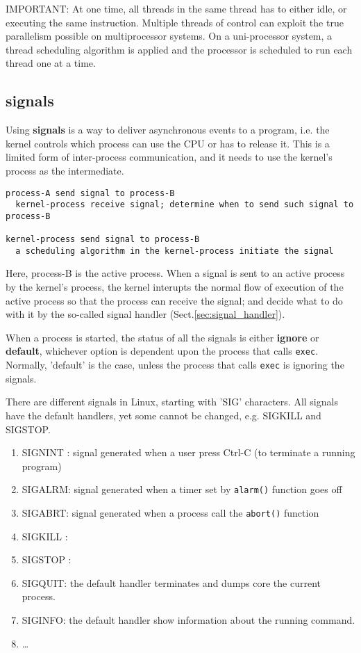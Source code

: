 IMPORTANT: At one time, all threads in the same thread has to either idle, or
executing the same instruction.
Multiple threads of control can exploit the true parallelism possible on
multiprocessor systems. On a uni-processor system, a thread scheduling algorithm
is applied and the processor is scheduled to run each thread one at a time.




\subsection{signals}
\label{sec:signals}

Using {\bf signals} is a way to deliver asynchronous events to a program, i.e.
the kernel controls which process can use the CPU or has to release it.
This is a limited form of inter-process communication, and it needs to use
the kernel's process as the intermediate.
{\tiny
\begin{verbatim}
process-A send signal to process-B
  kernel-process receive signal; determine when to send such signal to process-B
  
kernel-process send signal to process-B
  a scheduling algorithm in the kernel-process initiate the signal
\end{verbatim}
}

Here, process-B is the active process. When a signal is sent to an active
process by the kernel's process, the kernel interupts the normal flow of
execution of the active process so that the process can receive the signal; and
decide what to do with it by the so-called signal handler
(Sect.\ref{sec:signal_handler}).

When a process is started, the status of
all the signals is either {\bf ignore} or {\bf default}, whichever
option is dependent upon the process that calls \verb!exec!. Normally, 'default'
is the case, unless the process that calls \verb!exec! is ignoring the signals.

There are different signals in Linux, starting with 'SIG' characters. All
signals have the default handlers, yet some cannot be changed, e.g. SIGKILL and
SIGSTOP.

\begin{enumerate}
  \item SIGNINT : signal generated when a user press Ctrl-C (to terminate a
  running program)
  \item SIGALRM: signal generated when a timer set by \verb!alarm()! function
  goes off
  \item SIGABRT: signal generated when a process call the \verb!abort()!
  function
  \item SIGKILL :
  \item SIGSTOP :
  \item SIGQUIT: the default handler terminates and dumps core the
  current process.
  \item SIGINFO: the default handler show information about the running command.
  \item \ldots
\end{enumerate}

